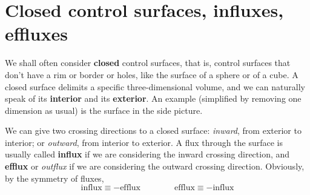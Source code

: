 \documentclass[a4paper,12pt,%
onecolumn,oneside,%
british%
]{memoir}
\renewcommand*{\|}[1][]{\nonscript\:#1\vert\nonscript\:\mathopen{}}
\begin{document}
\section{Closed control surfaces, influxes, effluxes}
\label{sec:in_out_flux}

We shall often consider \textbf{closed} control surfaces, that is, control surfaces that don't have a rim or border or holes, like the surface of a sphere or of a cube. A closed surface delimits a specific three-dimensional volume, and we can naturally speak of its \textbf{interior} and its \textbf{exterior}. An example (simplified by removing one dimension as usual) is the surface in the side picture.


We can give two crossing directions to a closed surface: \emph{inward}, from exterior to interior; or \emph{outward}, from interior to exterior. A flux through the surface is usually called \textbf{influx} if we are considering the inward crossing direction, and \textbf{efflux} or \emph{outflux} if we are considering the outward crossing direction. Obviously, by the symmetry of fluxes,
\begin{equation*}
  \text{influx} \equiv -\text{efflux}
  \qquad\qquad
  \text{efflux} \equiv -\text{influx}
\end{equation*}


\end{document}
